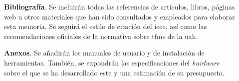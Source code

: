 \begin{description}
    \item[]\textbf{Bibliografía}. Se incluirán todas las referencias de artículos, libros, páginas web u otros materiales que han sido consultados y empleados para elaborar esta memoria. Se seguirá el estilo de citación del \gls{ieee}, así como las recomendaciones oficiales de la normativa sobre \gls{tfm}s de la \gls{uah}. 

    \item[]\textbf{Anexos}. Se añadirán los manuales de usuario y de instalación de herramientas. También, se expondrán las especificaciones del \textit{hardware} sobre el que se ha desarrollado este  y una estimación de su presupuesto.
\end{description}
